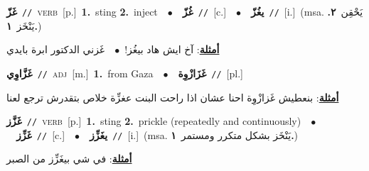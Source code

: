\documentclass[10pt,a4paper,twoside]{article} %
\begin{document}
\begin{multicols}{2}
{\setlength\topsep{0pt}\textbf{\foreignlanguage{arabic}{غَزّ}}\ {\color{gray}\texttt{//}\color{black}}\ \textsc{verb}\ [p.]\ \textbf{1.}~sting  \textbf{2.}~inject\ \ $\bullet$\ \ \setlength\topsep{0pt}\textbf{\foreignlanguage{arabic}{غُزّ}}\ {\color{gray}\texttt{//}\color{black}}\ [c.]\ \ $\bullet$\ \ \setlength\topsep{0pt}\textbf{\foreignlanguage{arabic}{يغُزّ}}\ {\color{gray}\texttt{//}\color{black}}\ [i.]\ \color{gray}(msa. \foreignlanguage{arabic}{يَحْقِن}~\foreignlanguage{arabic}{\textbf{٢.}}  \foreignlanguage{arabic}{يَنْخَز}~\foreignlanguage{arabic}{\textbf{١.}})\color{black}\  \begin{flushright}\color{gray}\foreignlanguage{arabic}{\textbf{\underline{\foreignlanguage{arabic}{أمثلة}}}: آخ ايش هاد بيغُز!\ $\bullet$\ \  غَزني الدكتور ابرة بايدي}\end{flushright}\color{black}} \vspace{2mm}

{\setlength\topsep{0pt}\textbf{\foreignlanguage{arabic}{غَزَّاوِي}}\ {\color{gray}\texttt{//}\color{black}}\ \textsc{adj}\ [m.]\ \textbf{1.}~from Gaza\ \ $\bullet$\ \ \setlength\topsep{0pt}\textbf{\foreignlanguage{arabic}{غَزَازْوِة}}\ {\color{gray}\texttt{//}\color{black}}\ [pl.]\  \begin{flushright}\color{gray}\foreignlanguage{arabic}{\textbf{\underline{\foreignlanguage{arabic}{أمثلة}}}: بنعطيش غَزازْوِة احنا عشان اذا راحت البنت عغزِّة خلاص بتقدرش ترجع لعنا}\end{flushright}\color{black}} \vspace{2mm}

{\setlength\topsep{0pt}\textbf{\foreignlanguage{arabic}{غَزَّز}}\ {\color{gray}\texttt{//}\color{black}}\ \textsc{verb}\ [p.]\ \textbf{1.}~sting  \textbf{2.}~prickle (repeatedly and continuously)\ \ $\bullet$\ \ \setlength\topsep{0pt}\textbf{\foreignlanguage{arabic}{غَزِّز}}\ {\color{gray}\texttt{//}\color{black}}\ [c.]\ \ $\bullet$\ \ \setlength\topsep{0pt}\textbf{\foreignlanguage{arabic}{يغَزِّز}}\ {\color{gray}\texttt{//}\color{black}}\ [i.]\ \color{gray}(msa. \foreignlanguage{arabic}{يَنْخَز بشكل متكرر ومستمر}~\foreignlanguage{arabic}{\textbf{١.}})\color{black}\  \begin{flushright}\color{gray}\foreignlanguage{arabic}{\textbf{\underline{\foreignlanguage{arabic}{أمثلة}}}: في شي بيغَزِّز من الصبر}\end{flushright}\color{black}} \vspace{2mm}


\end{multicols}
\end{document}
